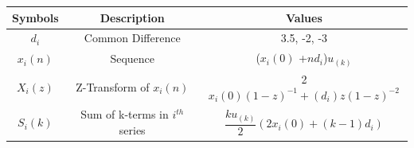 \documentclass[journal,12pt,twocolumn]{IEEEtran}
\theoremstyle{remark}
\begin{document}
\begin{enumerate}
\vspace{0.05cm}

  \vspace{1cm}
 \begin{center}
\begin{tabular}{ |c|c|c| } 
 \hline
 Symbols & Description & Values    \\
 \hline
  \small $d_i$ & \small Common Difference & 3.5, -2, -3\\
  \small $x_i(n)$ & \small Sequence  &  \scriptsize ($x_i(0)$ +$nd_i$)$u_{(k)}$\\
     \small $X_i(z)$ & \small Z-Transform of $x_i(n)$ & \scriptsize 2$x_i(0)(1-z)^{-1}+(d_i)z(1-z)^{-2}$ \\
     \small $S_i(k)$ & \scriptsize Sum of k-terms in $i^{th}$ series & \scriptsize $\dfrac{ku_{(k)}}{2}(2x_i(0) + (k-1)d_i)$\\
 \hline
\end{tabular}
\centering
\captionsetup{Table 1 : Symbols ,Description and Values }
\end{center}
\end{enumerate}
\end{document}
